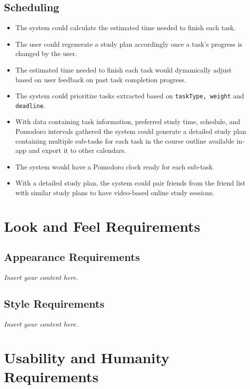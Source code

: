 \documentclass[12pt]{article}
\newcommand{\lips}{\textit{Insert your content here.}}
\newcounter{reqnum} %
\newcommand{\rthereqnum}{FR\refstepcounter{reqnum}\thereqnum:}
\begin{document}
\subsection{Scheduling}
\begin{itemize}
\item[\rthereqnum]
The system could calculate the estimated time needed to finish each task. 
\item[\rthereqnum]
The user could regenerate a study plan accordingly once a task's progress is changed by the user.
\item[\rthereqnum]
The estimated time needed to finish each task would dynamically adjust based on user feedback on past task completion progress.
\item[\rthereqnum]
The system could prioritize tasks extracted based on \texttt{taskType, weight} and \texttt{deadline}.
\item[\rthereqnum]
With data containing task information, preferred study time, schedule, and Pomodoro intervals gathered the system could generate a detailed study plan containing multiple sub-tasks for each task in the course outline available in-app and export it to other calendars.
\item[\rthereqnum]
The system would have a Pomodoro clock ready for each sub-task.
\item[\rthereqnum]
With a detailed study plan, the system could pair friends from the friend list with similar study plans to have video-based online study sessions.
\end{itemize}
\section{Look and Feel Requirements}
\subsection{Appearance Requirements}
\lips
\subsection{Style Requirements}
\lips

\section{Usability and Humanity Requirements}
\end{document}
